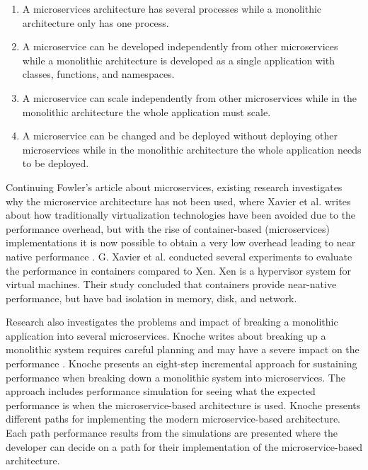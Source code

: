 \documentclass[a4paper,oneside]{bth}
\begin{document}
\begin{enumerate}

\item A microservices architecture has several processes while a monolithic architecture only has one process.
\item A microservice can be developed independently from other microservices while a monolithic architecture is developed as a single application with classes, functions, and namespaces.
\item A microservice can scale independently from other microservices while in the monolithic architecture the whole application must scale.
\item A microservice can be changed and be deployed without deploying other microservices while in the monolithic architecture the whole application needs to be deployed.

\end{enumerate}

Continuing Fowler's article about microservices, existing research investigates why the microservice architecture has not been used, where Xavier et al. writes about how traditionally virtualization technologies have been avoided due to the performance overhead, but with the rise of container-based (microservices) implementations it is now possible to obtain a very low overhead leading to near native performance \cite{Xavier}. G. Xavier et al. conducted several experiments to evaluate the performance in containers compared to Xen. Xen is a hypervisor system for virtual machines. Their study concluded that containers provide near-native performance, but have bad isolation in memory, disk, and network.

\par\vspace {0.5cm}

Research also investigates the problems and impact of breaking a monolithic application into several microservices. Knoche writes about breaking up a monolithic system requires careful planning and may have a severe impact on the performance \cite{Knoche}. Knoche presents an eight-step incremental approach for sustaining performance when breaking down a monolithic system into microservices. The approach includes performance simulation for seeing what the expected performance is when the microservice-based architecture is used. Knoche presents different paths for implementing the modern microservice-based architecture. Each path performance results from the simulations are presented where the developer can decide on a path for their implementation of the microservice-based architecture.
\end{document}
